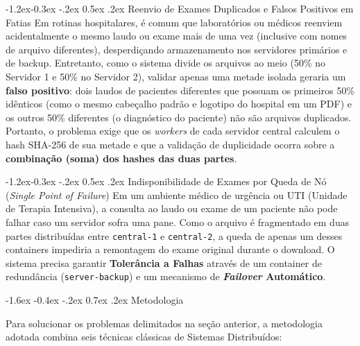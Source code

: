 \documentclass[12pt]{article}
\makeatletter
\renewcommand\section{\@startsection {section}{1}{\z@}%
    {-1.6ex \@plus -0.4ex \@minus -.2ex}%
    {0.7ex \@plus.2ex}%
    {\normalfont\large\bfseries}}
\renewcommand\subsection{\@startsection{subsection}{2}{\z@}%
    {-1.2ex\@plus -0.3ex \@minus -.2ex}%
    {0.5ex \@plus .2ex}%
    {\normalfont\normalsize\bfseries}}
\makeatother
\begin{document}
\subsection{Reenvio de Exames Duplicados e Falsos Positivos em Fatias}
Em rotinas hospitalares, é comum que laboratórios ou médicos reenviem acidentalmente o mesmo laudo ou exame mais de uma vez (inclusive com nomes de arquivo diferentes), desperdiçando armazenamento nos servidores primários e de backup. Entretanto, como o sistema divide os arquivos ao meio (50\% no Servidor 1 e 50\% no Servidor 2), validar apenas uma metade isolada geraria um \textbf{falso positivo}: dois laudos de pacientes diferentes que possuam os primeiros 50\% idênticos (como o mesmo cabeçalho padrão e logotipo do hospital em um PDF) e os outros 50\% diferentes (o diagnóstico do paciente) não são arquivos duplicados. Portanto, o problema exige que os \textit{workers} de cada servidor central calculem o hash SHA-256 de sua metade e que a validação de duplicidade ocorra sobre a \textbf{combinação (soma) dos hashes das duas partes}.

\subsection{Indisponibilidade de Exames por Queda de Nó (\textit{Single Point of Failure})}
Em um ambiente médico de urgência ou UTI (Unidade de Terapia Intensiva), a consulta ao laudo ou exame de um paciente não pode falhar caso um servidor sofra uma pane. Como o arquivo é fragmentado em duas partes distribuídas entre \texttt{central-1} e \texttt{central-2}, a queda de apenas um desses containers impediria a remontagem do exame original durante o download. O sistema precisa garantir \textbf{Tolerância a Falhas} através de um container de redundância (\texttt{server-backup}) e um mecanismo de \textbf{\textit{Failover} Automático}.

\section{Metodologia}

Para solucionar os problemas delimitados na seção anterior, a metodologia adotada combina seis técnicas clássicas de Sistemas Distribuídos:
\end{document}
